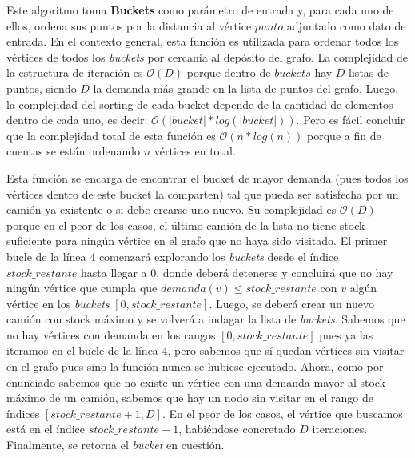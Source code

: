 \vskip 8pt



Este algoritmo toma \textbf{Buckets} como parámetro de entrada y, para cada uno de ellos, ordena sus puntos por la distancia al vértice $punto$ adjuntado como dato de entrada. En el contexto general, esta función es utilizada para ordenar todos los vértices de todos los \textit{buckets} por cercanía al depósito del grafo. La complejidad de la estructura de iteración es $\mathcal{O}(D)$ porque dentro de $buckets$ hay $D$ listas de puntos, siendo $D$ la demanda más grande en la lista de puntos del grafo. Luego, la complejidad del sorting de cada bucket depende de la cantidad de elementos dentro de cada uno, es decir: $\mathcal{O}(|bucket| * log(|bucket|))$. Pero es fácil concluir que la complejidad total de esta función es $\mathcal{O}(n * log(n))$ porque a fin de cuentas se están ordenando $n$ vértices en total.



Esta función se encarga de encontrar el bucket de mayor demanda (pues todos los vértices dentro de este bucket la comparten) tal que pueda ser satisfecha por un camión ya existente o si debe crearse uno nuevo. Su complejidad es $\mathcal{O}(D)$ porque en el peor de los casos, el último camión de la lista no tiene stock suficiente para ningún vértice en el grafo que no haya sido visitado. El primer bucle de la línea 4 comenzará explorando los \textit{buckets} desde el índice $stock\_restante$ hasta llegar a $0$, donde deberá detenerse y concluirá que no hay ningún vértice que cumpla que $demanda(v) \leq stock\_restante$ con $v$ algún vértice en los \textit{buckets} $[0, stock\_restante]$. Luego, se deberá crear un nuevo camión con stock máximo y se volverá a indagar la lista de \textit{buckets}. Sabemos que no hay vértices con demanda en los rangos $[0, stock\_restante]$ pues ya las iteramos en el bucle de la línea 4, pero sabemos que sí quedan vértices sin visitar en el grafo pues sino la función nunca se hubiese ejecutado. Ahora, como por enunciado sabemos que no existe un vértice con una demanda mayor al stock máximo de un camión, sabemos que hay un nodo sin visitar en el rango de índices $[stock\_restante + 1, D]$. En el peor de los casos, el vértice que buscamos está en el índice $stock\_restante + 1$, habiéndose concretado $D$ iteraciones. Finalmente, se retorna el \textit{bucket} en cuestión.



